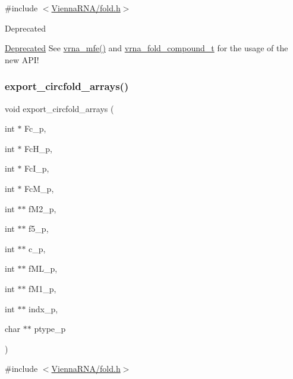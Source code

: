 {\ttfamily \#include $<$\hyperlink{fold_8h}{Vienna\+R\+N\+A/fold.\+h}$>$}

\begin{DoxyRefDesc}{Deprecated}
\item[\hyperlink{deprecated__deprecated000075}{Deprecated}]See \hyperlink{group__mfe__fold_gabd3b147371ccf25c577f88bbbaf159fd}{vrna\+\_\+mfe()} and \hyperlink{group__fold__compound_ga1b0cef17fd40466cef5968eaeeff6166}{vrna\+\_\+fold\+\_\+compound\+\_\+t} for the usage of the new A\+P\+I!\end{DoxyRefDesc}
\mbox{\label{group__mfe__fold__single_ga04d5d639fd4473ca766436a9bae5665c}} 
\subsubsection{\texorpdfstring{export\+\_\+circfold\+\_\+arrays()}{export\_circfold\_arrays()}}
{\footnotesize\ttfamily void export\+\_\+circfold\+\_\+arrays (\begin{DoxyParamCaption}\item[{int $\ast$}]{Fc\+\_\+p,  }\item[{int $\ast$}]{Fc\+H\+\_\+p,  }\item[{int $\ast$}]{Fc\+I\+\_\+p,  }\item[{int $\ast$}]{Fc\+M\+\_\+p,  }\item[{int $\ast$$\ast$}]{f\+M2\+\_\+p,  }\item[{int $\ast$$\ast$}]{f5\+\_\+p,  }\item[{int $\ast$$\ast$}]{c\+\_\+p,  }\item[{int $\ast$$\ast$}]{f\+M\+L\+\_\+p,  }\item[{int $\ast$$\ast$}]{f\+M1\+\_\+p,  }\item[{int $\ast$$\ast$}]{indx\+\_\+p,  }\item[{char $\ast$$\ast$}]{ptype\+\_\+p }\end{DoxyParamCaption})}



{\ttfamily \#include $<$\hyperlink{fold_8h}{Vienna\+R\+N\+A/fold.\+h}$>$}


